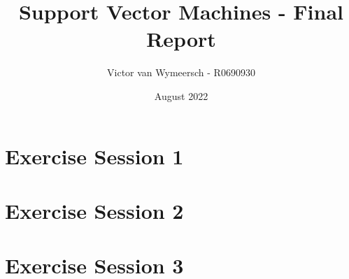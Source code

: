 \documentclass{article}
\title{Support Vector Machines - Final Report}
\author{Victor van Wymeersch - R0690930}
\date{August 2022}
\begin{document}
\maketitle
\newpage

\section*{Exercise Session 1}


\newpage
\section*{Exercise Session 2} 

\newpage
\section*{Exercise Session 3}
\end{document}
